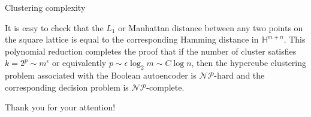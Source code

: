 \documentclass[9pt]{beamer}
\begin{document}
\begin{frame}{Clustering complexity}
\begin{multicols}{2}
\begin{center}
    \end{center}

        \end{multicols}
        It is easy to check that the $L_1$ or Manhattan distance between any two points on the square lattice is equal to the corresponding Hamming distance in $\mathbb{H}^{m+n}$.
        This polynomial reduction completes the proof that if the number of cluster satisfies $k = 2^p \sim m^\epsilon$ or equivalently $p \sim \epsilon \log_2 m \sim C \log n$, then the hypercube clustering problem associated with the Boolean autoencoder is $\mathcal{NP}$-hard and the corresponding decision problem is $\mathcal{NP}$-complete.
\end{frame}



\begin{frame}
    \begin{center}
        \Huge
        Thank you for your attention!
    \end{center}
\end{frame}
\end{document}

